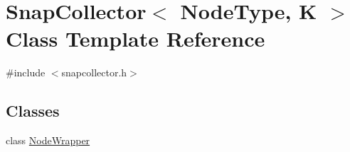 \hypertarget{classSnapCollector}{}\section{Snap\+Collector$<$ Node\+Type, K $>$ Class Template Reference}
\label{classSnapCollector}


{\ttfamily \#include $<$snapcollector.\+h$>$}

\subsection*{Classes}
\begin{DoxyCompactItemize}
\item 
class \hyperlink{classSnapCollector_1_1NodeWrapper}{Node\+Wrapper}
\end{DoxyCompactItemize}
